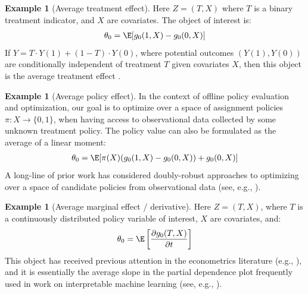\documentclass[nohyperref]{article}
\newcommand{\der}[2]{\frac{\partial #1}{\partial #2}}
\theoremstyle{plain}
\theoremstyle{definition}
\newtheorem{example}[theorem]{Example}
\theoremstyle{remark}
\begin{document}
\begin{example}[Average treatment effect] \label{ex1} Here $Z=(T,X)$ where $T$ is a binary treatment indicator, and $X$ are covariates. The object of interest is:
\begin{align*}
    \theta_0 = \E[g_0(1,X)-g_0(0,X)] %
\end{align*}
If $Y = T\cdot Y(1) + (1 - T) \cdot Y(0)$, where potential outcomes $(Y(1), Y(0))$ are conditionally independent of treatment $T$ given covariates $X$, then this object is the average treatment effect \citep{rosenbaum1983central}.
\end{example}

\begin{example}[Average policy effect] \label{ex2} In the context of offline policy evaluation and optimization, our goal is to optimize over a space of assignment policies $\pi: X \to \{0,1\}$, when having access to observational data collected by some unknown treatment policy. The policy value can also be formulated as the average of a linear moment:
\small
\begin{align*}
    \theta_0 = \E[\pi(X) (g_0(1, X) - g_0(0, X)) + g_0(0, X)] %
\end{align*}
\normalsize
A long-line of prior work has considered doubly-robust approaches to optimizing over a space of candidate policies from observational data (see, e.g., \citealp{dudik2011doubly,athey2021policy}).
\end{example}

\begin{example}[Average marginal effect / derivative] \label{ex3} Here $Z=(T,X)$, where $T$ is a continuously distributed policy variable of interest, $X$ are covariates, and:
\begin{align*}
    \theta_0 = \E\left[\der{g_0(T,X)}{t}\right] %
\end{align*}
This object has received previous attention in the econometrics literature (e.g., \citealp{imbens2009identification}), and it is essentially the average slope in the partial dependence plot frequently used in work on interpretable machine learning (see, e.g., \citealp{zhao2021causal,Friedman2001,molnar2020interpretable}).
\end{example}
\end{document}

